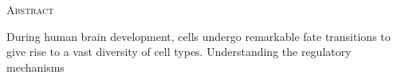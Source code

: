 \begin{center}
    \large\textsc{Abstract}
\end{center}

During human brain development, cells undergo remarkable fate transitions to give rise to a vast diversity of cell types. Understanding the regulatory mechanisms 
